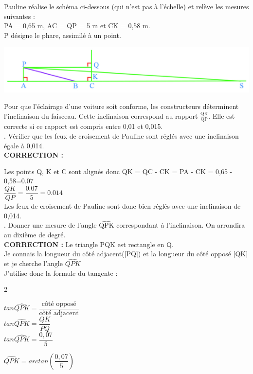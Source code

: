 \documentclass[a4paper,11pt]{article}
\newcounter{enumtabi}
\newcommand{\q}{\stepcounter{enumtabi} \theenumtabi.  }
\newcommand{\initq}{\setcounter{enumtabi}{0}}
\newcommand{\bmul}[1]{\begin{multicols}{#1}}
\newcommand{\emul}{\end{multicols}}
\begin{document}
Pauline réalise le schéma ci-dessous (qui n'est pas à l'échelle) et relève les mesures suivantes : \\
PA = 0,65 m, AC = QP = 5 m et CK = 0,58 m.\\
P désigne le phare, assimilé à un point.

\begin{center}
\includegraphics[scale=0.85]{trigo7.eps} 
\end{center}

Pour que l'éclairage d'une voiture soit conforme, les constructeurs déterminent l'inclinaison du faisceau. Cette inclinaison correspond au rapport $\frac{\mathrm{QK}}{\mathrm{QP}}$. Elle est correcte si ce rapport est compris entre 0,01 et 0,015.\\

\initq \q Vérifier que les feux de croisement de Pauline sont réglés avec une inclinaison égale à 0,014.\\


\color{red}
\textbf{CORRECTION :}

Les points Q, K et C sont alignés donc QK = QC - CK = PA - CK = 0,65 - 0,58=0.07\\

$\dfrac{QK}{QP}=\dfrac{0.07}{5}=0.014$\\


Les feux de croisement de Pauline sont donc bien réglés avec une inclinaison de 0,014.\\

\color{black}
\q Donner une mesure de l'angle $\widehat{\mathrm{QPK}}$ correspondant à l'inclinaison. On arrondira au dixième de degré.\\



\color{red}
\textbf{CORRECTION :}
Le triangle PQK est rectangle en Q. \\
Je connais la longueur du côté adjacent([PQ]) et la longueur du côté opposé [QK] et je cherche l'angle $\widehat{QPK}$\\

J'utilise donc la formule du tangente :

\bmul{2}

$tan \widehat{QPK} = \dfrac{\textrm{côté opposé}}{\textrm{côté adjacent}} $\\

$tan \widehat{QPK} = \dfrac{QK}{PQ}$\\

$tan \widehat{QPK} = \dfrac{0,07}{5}$\\

\columnbreak

 $ \widehat{QPK} = arctan(\dfrac{0,07}{5})$\\


\emul




\color{black}
\end{document}
